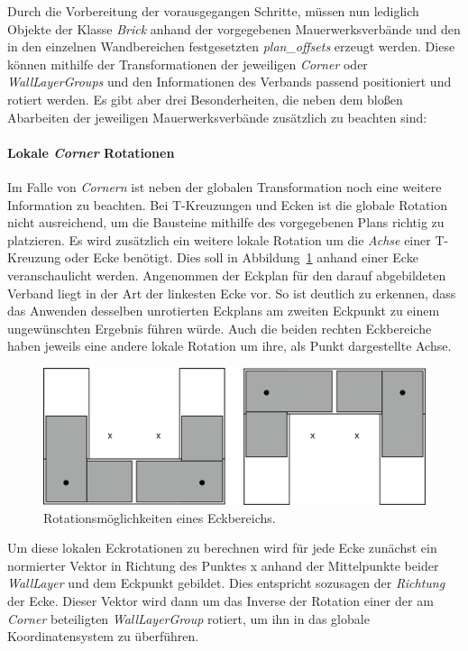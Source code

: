 Durch die Vorbereitung der vorausgegangen Schritte, müssen nun lediglich Objekte der Klasse \textit{Brick} anhand der vorgegebenen Mauerwerksverbände und den in den einzelnen Wandbereichen festgesetzten \textit{plan\_offsets} erzeugt werden.
Diese können mithilfe der Transformationen der jeweiligen \textit{Corner} oder \textit{WallLayerGroups} und den Informationen des Verbands passend positioniert und rotiert werden.
Es gibt aber drei Besonderheiten, die neben dem bloßen Abarbeiten der jeweiligen Mauerwerksverbände zusätzlich zu beachten sind:

\paragraph*{Lokale \textit{Corner} Rotationen}
Im Falle von \textit{Cornern} ist neben der globalen Transformation noch eine weitere Information zu beachten.
Bei T-Kreuzungen und Ecken ist die globale Rotation nicht ausreichend, um die Bausteine mithilfe des vorgegebenen Plans richtig zu platzieren.
Es wird zusätzlich ein weitere lokale Rotation um die \textit{Achse} einer T-Kreuzung oder Ecke benötigt.
Dies soll in Abbildung~\ref{fig:real:eckrotationen} anhand einer Ecke veranschaulicht werden.
Angenommen der Eckplan für den darauf abgebildeten Verband liegt in der Art der linkesten Ecke vor.
So ist deutlich zu erkennen, dass das Anwenden desselben unrotierten Eckplans am zweiten Eckpunkt zu einem ungewünschten Ergebnis führen würde.
Auch die beiden rechten Eckbereiche haben jeweils eine andere lokale Rotation um ihre, als Punkt dargestellte Achse.
\begin{figure}[hb]
  \centering
  \includegraphics[width=0.9\columnwidth]{fig/Eckrotationen.png}
  \caption{Rotationsmöglichkeiten eines Eckbereichs.}
  \label{fig:real:eckrotationen}
\end{figure}
Um diese lokalen Eckrotationen zu berechnen wird für jede Ecke zunächst ein normierter Vektor in Richtung des Punktes x anhand der Mittelpunkte beider \textit{WallLayer} und dem Eckpunkt gebildet.
Dies entspricht sozusagen der \textit{Richtung} der Ecke.
Dieser Vektor wird dann um das Inverse der Rotation einer der am \textit{Corner} beteiligten \textit{WallLayerGroup} rotiert, um ihn in das globale Koordinatensystem zu überführen.
